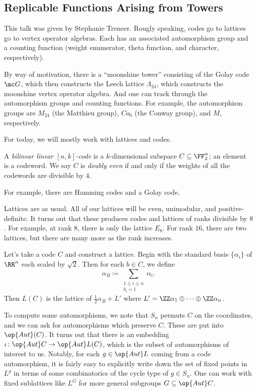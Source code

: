 \documentclass{article}
\begin{document}
\subsection{Replicable Functions Arising from Towers}
This talk was given by Stephanie Treneer. Rougly speaking, codes go to lattices go to vertex operator algebras. Each has an associated automorphism group and a counting function (weight enumerator, theta function, and character, respectively).
\begin{example}
	By way of motivation, there is a ``moonshine tower'' consisting of the Golay code $\mc G$, which then constructs the Leech lattice $\Lambda_{24}$, which constructs the moonshine vertex operator algebra. And one can track through the automorphism groups and counting functions. For example, the automorphism groups are $M_{24}$ (the Matthieu group), $Co_0$ (the Conway group), and $M$, respectively.
\end{example}
For today, we will mostly work with lattices and codes.
\begin{definition}
	A \textit{bilinear linear $[n,k]$-code} is a $k$-dimensional subspace $C\subseteq\FF_2^n$; an element is a codeword. We say $C$ is \textit{doubly even} if and only if the weights of all the codewords are divisible by $4$.
\end{definition}
For example, there are Hamming codes and a Golay code.

Lattices are as usual. All of our lattices will be even, unimodular, and positive-definite. It turns out that these produces codes and lattices of ranks divisible by $8$. For example, at rank $8$, there is only the lattice $E_8$. For rank $16$, there are two lattices, but there are many more as the rank increases.

Let's take a code $C$ and construct a lattice. Begin with the standard basis $\{\alpha_i\}$ of $\RR^n$ each scaled by $\sqrt2$. Then for each $b\in C$, we define
\[\alpha_B\coloneqq\sum_{\substack{1\le i\le n\\b_i=1}}\alpha_i.\]
Then $L(C)$ is the lattice of $\frac12\alpha_B+L'$ where $L'=\ZZ\alpha_1\oplus\cdots\oplus\ZZ\alpha_n$.

To compute some automorphisms, we note that $S_n$ permuts $C$ on the coordinates, and we can ask for automorphisms which preserve $C$. These are put into $\op{Aut}(C)$. It turns out that there is an embedding $\iota\colon\op{Aut}C\to\op{Aut}L(C)$, which is the subset of automorphisms of interest to us. Notably, for each $g\in\op{Aut}L$ coming from a code automorphism, it is fairly easy to explicitly write down the set of fixed points in $L^g$ in terms of some combinatorics of the cycle type of $g\in S_n$. One can work with fixed sublattices like $L^G$ for more general subgroups $G\subseteq\op{Aut}C$.
\end{document}
